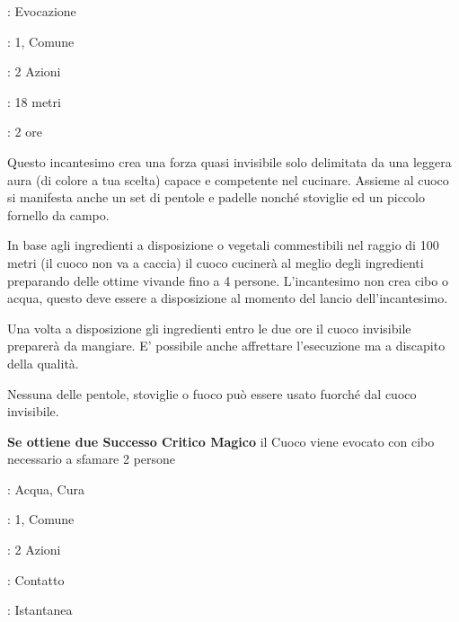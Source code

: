 \begin{multicols}{2}
\noindent\colorbox{OBSSgold!10}{
\begin{minipage}{0.95\linewidth}
\begin{description}[noitemsep, topsep=0pt, parsep=0pt, partopsep=0pt, leftmargin=0cm, labelwidth=1.3cm]
	\item[\textbf{Lista}]: Evocazione
	\item[\textbf{Livello}]: 1, Comune
	\item[\textbf{Lancio}]: 2 Azioni
	\item[\textbf{Gittata}]: 18 metri
	\item[\textbf{Durata}]: 2 ore
\end{description}
\end{minipage}}\smallskip

Questo incantesimo crea una forza quasi invisibile solo delimitata da una leggera aura (di colore a tua scelta) capace e competente nel cucinare. Assieme al cuoco si manifesta anche un set di pentole e padelle nonché stoviglie ed un piccolo fornello da campo.

In base agli ingredienti a disposizione o vegetali commestibili nel raggio di 100 metri (il cuoco non va a caccia) il cuoco cucinerà al meglio degli ingredienti preparando delle ottime vivande fino a 4 persone. L'incantesimo non crea cibo o acqua, questo deve essere a disposizione al momento del lancio dell'incantesimo.

Una volta a disposizione gli ingredienti entro le due ore il cuoco invisibile preparerà da mangiare. E' possibile anche affrettare l'esecuzione ma a discapito della qualità.

Nessuna delle pentole, stoviglie o fuoco può essere usato fuorché dal cuoco invisibile.

\textbf{Se ottiene due Successo Critico Magico} il Cuoco viene evocato con cibo necessario a sfamare 2 persone

\noindent\colorbox{OBSSgold!10}{
\begin{minipage}{0.95\linewidth}
\begin{description}[noitemsep, topsep=0pt, parsep=0pt, partopsep=0pt, leftmargin=0cm, labelwidth=1.3cm]
	\item[\textbf{Lista}]: Acqua, Cura
	\item[\textbf{Livello}]: 1, Comune
	\item[\textbf{Lancio}]: 2 Azioni
	\item[\textbf{Gittata}]: Contatto
	\item[\textbf{Durata}]: Istantanea
\end{description}
\end{minipage}}\smallskip


\end{multicols}
